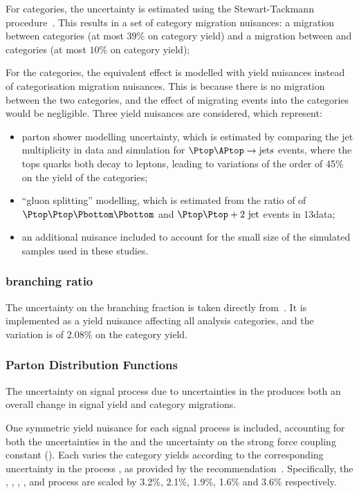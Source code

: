 For \VBFTag categories, the uncertainty is estimated using the Stewart-Tackmann procedure~\cite{StewartTackmann}. This results in a set of category migration nuisances: a migration between \VBFTag categories (at most $39\%$ on category yield) and a migration between \Untagged and \VBFTag categories (at most $10\%$ on category yield); %

For the \TTHTag categories, the equivalent effect is modelled with yield nuisances instead of categorisation migration nuisances. This is because there is no migration between the two \TTHTag categories, and the effect of migrating events into the \Untagged categories would be negligible. Three yield nuisances are considered, which represent:
\begin{itemize}
\item parton shower modelling uncertainty, which is estimated by comparing the jet multiplicity in data and simulation for $\Ptop \APtop \rightarrow \text{jets}$ events, where the tops quarks both decay to leptons, leading to variations of the order of 45\% on the yield of the \TTHTag categories; 
\item ``gluon splitting'' modelling, which is estimated from the ratio of \crosssection\s of $\Ptop \Ptop \Pbottom \Pbottom$ and $\Ptop \Ptop +2\text{ jet}$ events in 13\TeV data;
\item an additional nuisance included to account for the small size of the simulated samples used in these studies.
\end{itemize}

\subsubsection{\Hgg branching ratio}
The uncertainty on the \SM \Hgg branching fraction is taken directly from~\cite{LHCHXSWGYR4}. It is implemented as a yield nuisance affecting all analysis categories, and the variation is of 2.08\% on the category yield.

\subsubsection{Parton Distribution Functions}

The uncertainty on signal process \crosssection\s due to uncertainties in the \PDF produces both an overall change in signal yield and category migrations.

One symmetric yield nuisance for each signal process is included, accounting for both the uncertainties in the \PDF\s and the uncertainty on the strong force coupling constant (\alphaS). Each varies the category yields according to the corresponding uncertainty in the process \crosssection, as provided by the \LHCHXSWG recommendation~\cite{LHCHXSWGYR4}. Specifically, the \ggH, \VBF, \WH, \ZH, and \ttH process \crosssection\s are scaled by 3.2\%, 2.1\%, 1.9\%, 1.6\% and 3.6\% respectively. 

